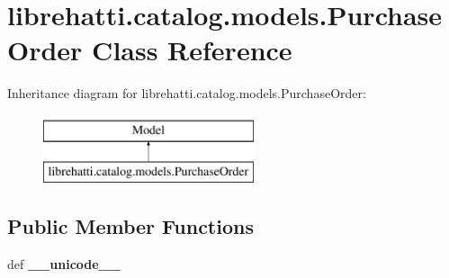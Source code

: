 \hypertarget{classlibrehatti_1_1catalog_1_1models_1_1PurchaseOrder}{\section{librehatti.\-catalog.\-models.\-Purchase\-Order Class Reference}
\label{classlibrehatti_1_1catalog_1_1models_1_1PurchaseOrder}
}
Inheritance diagram for librehatti.\-catalog.\-models.\-Purchase\-Order\-:\begin{figure}[H]
\begin{center}
\leavevmode
\includegraphics[height=2.000000cm]{classlibrehatti_1_1catalog_1_1models_1_1PurchaseOrder}
\end{center}
\end{figure}
\subsection*{Public Member Functions}
\begin{DoxyCompactItemize}
\item 
\hypertarget{classlibrehatti_1_1catalog_1_1models_1_1PurchaseOrder_aabe49ee20451298a11e44e2474872fb0}{def {\bfseries \-\_\-\-\_\-unicode\-\_\-\-\_\-}}\label{classlibrehatti_1_1catalog_1_1models_1_1PurchaseOrder_aabe49ee20451298a11e44e2474872fb0}

\end{DoxyCompactItemize}
